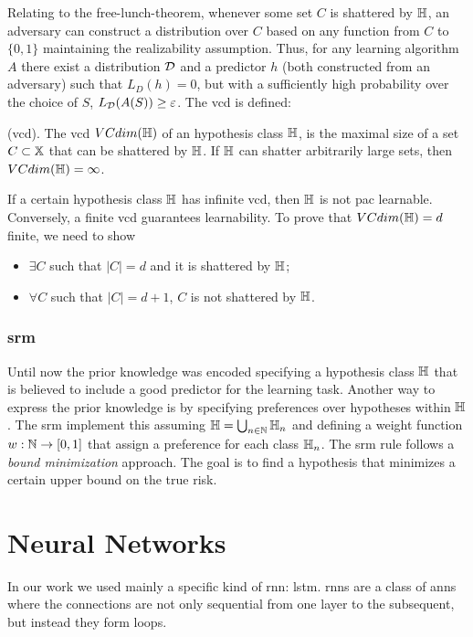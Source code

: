 Relating to the free-lunch-theorem, whenever some set $C$ is shattered
by $\mathbb{H}$, an adversary can 
construct a distribution over $C$ based on any function from $C$ to
$\{0,1\}$ maintaining the realizability assumption. Thus, for any
learning algorithm $A$ there exist a distribution $\mathcal{D}$ and a
predictor $h$
(both constructed from an adversary) such that $L_D(h)=0$, but with a
sufficiently high probability over the choice of $S$,
$L_{\mathcal{D}}(A(S))\geq\varepsilon$. The \ac{vcd} is defined:
\begin{definition}
  (\ac{vcd}). The \ac{vcd} $VCdim(\mathbb{H})$ of an hypothesis class
  $\mathbb{H}$, is the maximal size of a set $C\subset\mathbb{X}$ that can be
  shattered by $\mathbb{H}$. If $\mathbb{H}$ can shatter arbitrarily large sets,
  then $VCdim(\mathbb{H})=\infty$.
\end{definition}

If a certain hypothesis class $\mathbb{H}$ has infinite \ac{vcd}, then
$\mathbb{H}$ is not \ac{pac} learnable. Conversely, a finite \ac{vcd}
guarantees learnability. To prove that $VCdim(\mathbb{H})=d$ finite, we
need to show
\begin{itemize}
\item $\exists C$ such that $|C|=d$ and it is shattered by $\mathbb{H}$;
\item $\forall C$ such that $|C|=d+1$, $C$ is not shattered by
  $\mathbb{H}$. 
\end{itemize}

\subsubsection{\ac{srm}}
Until now the prior knowledge was encoded specifying a hypothesis
class $\mathbb{H}$ that is believed to include a good predictor for the
learning task. Another way to express the prior knowledge is by
specifying preferences over hypotheses within $\mathbb{H}$. The \ac{srm}
implement this assuming $\mathbb{H}=\bigcup_{n\in\mathbb{N}}\mathbb{H}_n$ and
defining a weight function $w:\mathbb{N}\rightarrow[0,1]$ that assign a
preference for each class $\mathbb{H}_n$. The \ac{srm} rule follows a
\emph{bound minimization} approach. The goal is to find a hypothesis
that minimizes a certain upper bound on the true risk.

\section{Neural Networks}
In our work we used mainly a specific kind of \ac{rnn}: \ac{lstm}.
\acp{rnn} are a class of \acp{ann} where the connections are not only
sequential from one layer to the subsequent, but instead they form
loops. 

